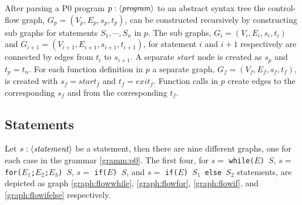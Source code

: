 After parsing a P0 program $p : \langle\mathit{\mathit{program}}\rangle$ to an abstract syntax tree the control-flow graph, $G_p = (V_p, E_p, s_p, t_p)$, can be constructed recursively by constructing sub graphs for statements $S_1, \cdots, S_n$ in $p$. The sub graphs, $G_i = (V_i, E_i, s_i, t_i)$ and $G_{i+1} = (V_{i+1}, E_{i+1}, s_{i+1}, t_{i+1})$, for statement $i$ and $i+1$ respectively are connected by edges from $t_i$ to $s_{i+1}$. A separate $\mathit{start}$ node is created as $s_p$ and $t_p = t_n$. For each function definition in $p$ a separate graph, $G_f = (V_f, E_f, s_f, t_f)$, is created with $s_f = \mathit{start}_f$ and $t_f = \mathit{exit}_f$. Function calls in $p$ create edges to the corresponding $s_f$ and from the corresponding $t_f$.

\subsection{Statements}
Let $s : \langle\mathit{statement}\rangle$ be a statement, then there are nine different graphs, one for each case in the grammar \ref{gramm:p0}. The first four, for $s = $ \texttt{while($E$) $S$}, $s = $ \texttt{for($E_1$;$ E_2$;$E_3$) $S$}, $s = $ \texttt{if($E$) $S$}, and $s = $ \texttt{if($E$) $S_1$ else $S_2$} statements, are depicted as graph \ref{graph:flowwhile}, \ref{graph:flowfor}, \ref{graph:flowif}, and \ref{graph:flowifelse} respectively.


